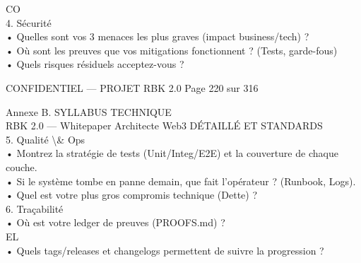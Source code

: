 \documentclass[12pt,landscape,a4paper]{article}
\newenvironment{confidential}
{\begin{tcolorbox}[
    colback=rbkred!5!white,
    colframe=rbkred!75!black,
    title=CONFIDENTIEL,
    fonttitle=\bfseries\color{white},
    coltitle=rbkred!75!black,
    breakable,
    enhanced,
    frame hidden,
    borderline west={2pt}{0pt}{rbkred!75!black}
]}
{\end{tcolorbox}}
\begin{document}
CO\\
4. Sécurité\\
\vspace{0.5em}
• Quelles sont vos 3 menaces les plus graves (impact business/tech) ?\\
\vspace{0.5em}
• Où sont les preuves que vos mitigations fonctionnent ? (Tests, garde-fous)\\
\vspace{0.5em}
• Quels risques résiduels acceptez-vous ?\\
\vspace{0.5em}
\vspace{0.5em}
\vspace{0.5em}
\vspace{0.5em}
\begin{confidential}CONFIDENTIEL — PROJET RBK 2.0                                Page 220 sur 316\end{confidential}
Annexe B. SYLLABUS TECHNIQUE\\
RBK 2.0 — Whitepaper Architecte Web3                                                                             DÉTAILLÉ ET STANDARDS\\
\vspace{0.5em}
\vspace{0.5em}
5. Qualité \textbackslash{}& Ops\\
\vspace{0.5em}
• Montrez la stratégie de tests (Unit/Integ/E2E) et la couverture de chaque couche.\\
\vspace{0.5em}
• Si le système tombe en panne demain, que fait l’opérateur ? (Runbook, Logs).\\
\vspace{0.5em}
• Quel est votre plus gros compromis technique (Dette) ?\\
\vspace{0.5em}
6. Traçabilité\\
\vspace{0.5em}
• Où est votre ledger de preuves (PROOFS.md) ?\\
\vspace{0.5em}
\vspace{0.5em}
\vspace{0.5em}
\vspace{0.5em}
EL\\
• Quels tags/releases et changelogs permettent de suivre la progression ?\\
\vspace{0.5em}
\end{document}
